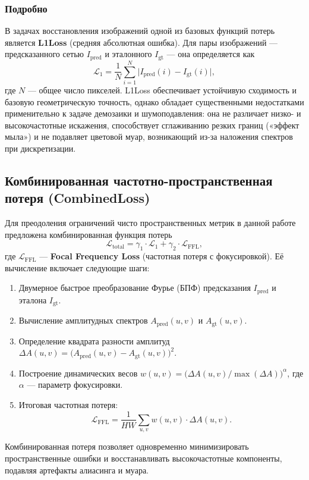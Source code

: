 \documentclass[12pt,a4paper]{article}
\begin{document}
\subsubsection{Подробно}

В задачах восстановления изображений одной из базовых функций потерь является \textbf{L1Loss} (средняя абсолютная ошибка). Для пары изображений — предсказанного сетью \(I_{\text{pred}}\) и эталонного \(I_{\text{gt}}\) — она определяется как
\[
\mathcal{L}_1 = \frac{1}{N}\sum_{i=1}^{N} \bigl|I_{\text{pred}}(i) - I_{\text{gt}}(i)\bigr|,
\]
где \(N\) — общее число пикселей. L1Loss обеспечивает устойчивую сходимость и базовую геометрическую точность, однако обладает существенными недостатками применительно к задаче демозаики и шумоподавления: она не различает низко- и высокочастотные искажения, способствует сглаживанию резких границ («эффект мыла») и не подавляет цветовой муар, возникающий из-за наложения спектров при дискретизации.

\subsection{Комбинированная частотно-пространственная потеря (CombinedLoss)}

Для преодоления ограничений чисто пространственных метрик в данной работе предложена комбинированная функция потерь
\[
\mathcal{L}_{\text{total}} = \gamma_1 \cdot \mathcal{L}_1 + \gamma_2 \cdot \mathcal{L}_{\text{FFL}},
\]
где \(\mathcal{L}_{\text{FFL}}\) — \textbf{Focal Frequency Loss} (частотная потеря с фокусировкой). Её вычисление включает следующие шаги:
\begin{enumerate}
    \item Двумерное быстрое преобразование Фурье (БПФ) предсказания \(I_{\text{pred}}\) и эталона \(I_{\text{gt}}\).
    \item Вычисление амплитудных спектров \(A_{\text{pred}}(u,v)\) и \(A_{\text{gt}}(u,v)\).
    \item Определение квадрата разности амплитуд \(\Delta A(u,v) = \bigl(A_{\text{pred}}(u,v) - A_{\text{gt}}(u,v)\bigr)^2\).
    \item Построение динамических весов \(w(u,v) = \bigl(\Delta A(u,v) / \max(\Delta A)\bigr)^{\alpha}\), где \(\alpha\) — параметр фокусировки.
    \item Итоговая частотная потеря:
    \[
    \mathcal{L}_{\text{FFL}} = \frac{1}{HW}\sum_{u,v} w(u,v) \cdot \Delta A(u,v).
    \]
\end{enumerate}
Комбинированная потеря позволяет одновременно минимизировать пространственные ошибки и восстанавливать высокочастотные компоненты, подавляя артефакты алиасинга и муара.
\end{document}
